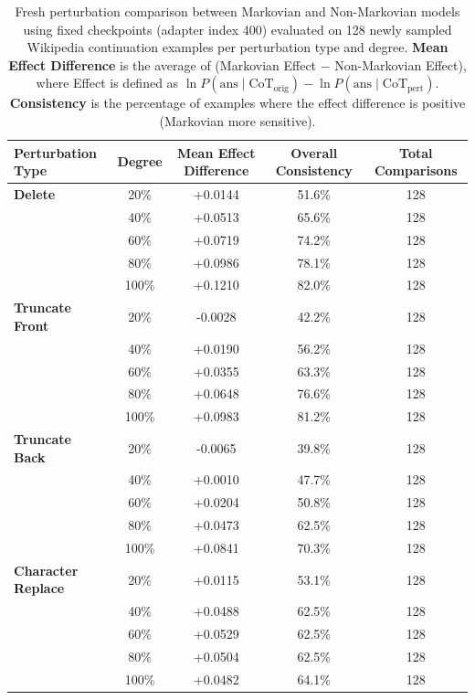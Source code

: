 \documentclass{article} %
\begin{document}
\begin{table}[ht]
  \centering
\small
\begin{tabular}{lcccc}
\hline
\textbf{Perturbation Type} & \textbf{Degree} & \textbf{Mean Effect Difference} & \textbf{Overall Consistency} & \textbf{Total Comparisons} \\
\hline
\textbf{Delete} & 20\% & +0.0144 & 51.6\% & 128 \\
& 40\% & +0.0513 & 65.6\% & 128 \\
& 60\% & +0.0719 & 74.2\% & 128 \\
& 80\% & +0.0986 & 78.1\% & 128 \\
& 100\% & +0.1210 & 82.0\% & 128 \\
\hline
\textbf{Truncate Front} & 20\% & -0.0028 & 42.2\% & 128 \\
& 40\% & +0.0190 & 56.2\% & 128 \\
& 60\% & +0.0355 & 63.3\% & 128 \\
& 80\% & +0.0648 & 76.6\% & 128 \\
& 100\% & +0.0983 & 81.2\% & 128 \\
\hline
\textbf{Truncate Back} & 20\% & -0.0065 & 39.8\% & 128 \\
& 40\% & +0.0010 & 47.7\% & 128 \\
& 60\% & +0.0204 & 50.8\% & 128 \\
& 80\% & +0.0473 & 62.5\% & 128 \\
& 100\% & +0.0841 & 70.3\% & 128 \\
\hline
\textbf{Character Replace} & 20\% & +0.0115 & 53.1\% & 128 \\
& 40\% & +0.0488 & 62.5\% & 128 \\
& 60\% & +0.0529 & 62.5\% & 128 \\
& 80\% & +0.0504 & 62.5\% & 128 \\
& 100\% & +0.0482 & 64.1\% & 128 \\
\hline
\end{tabular}
\caption{Fresh perturbation comparison between Markovian and Non-Markovian models using fixed checkpoints (adapter index 400) evaluated on 128 newly sampled Wikipedia continuation examples per perturbation type and degree. \textbf{Mean Effect Difference} is the average of (Markovian Effect \( - \) Non-Markovian Effect), where Effect is defined as \(\ln P(\text{ans}\mid \text{CoT}_{\text{orig}}) - \ln P(\text{ans}\mid \text{CoT}_{\text{pert}})\). \textbf{Consistency} is the percentage of examples where the effect difference is positive (Markovian more sensitive).}
\label{tab:markovian_comparison}
\end{table}
\end{document}
